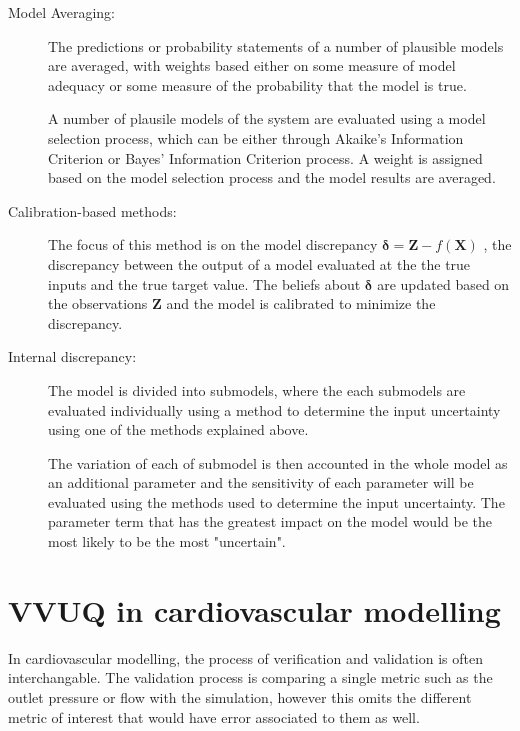 \begin{description}
\item[Model Averaging:]
The predictions or probability statements of a number of plausible models are averaged, with weights based either on some measure of model adequacy or some measure of the probability that the model is true. \par

A number of plausile models of the system are evaluated using a model selection process, which can be either through Akaike's Information Criterion or Bayes' Information Criterion process. A weight is assigned based on the model selection process and the model results are averaged. \par

\item[Calibration-based methods:] 
The focus of this method is on the model discrepancy $\mathbf{\delta} = \textbf{Z} - f(\textbf{X})$ , the discrepancy between the output of a model evaluated at the the true inputs and the true target value. The beliefs about $\mathbf{\delta}$ are updated based on the observations \textbf{Z} and the model is calibrated to minimize the discrepancy. \par

\item[Internal discrepancy:]
The model is divided into submodels, where the each submodels are evaluated individually using a method to determine the input uncertainty using one of the methods explained above. \par

The variation of each of submodel is then accounted in the whole model as an additional parameter and the sensitivity of each parameter will be evaluated using the methods used to determine the input uncertainty. The parameter term that has the greatest impact on the model would be the most likely to be the most "uncertain". \par

\end{description}


\section{VVUQ in cardiovascular modelling}
In cardiovascular modelling, the process of verification and validation is often interchangable. The validation process is comparing a single metric such as the outlet pressure or flow with the simulation, however this omits the different metric of interest that would have error associated to them as well. \par

